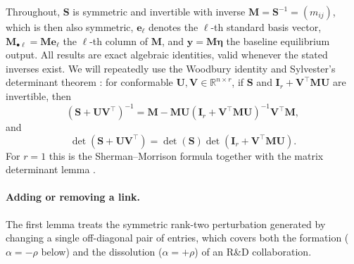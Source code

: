 Throughout, $\mathbf{S}$ is symmetric and invertible with inverse
$\mathbf{M} = \mathbf{S}^{-1} = (m_{ij})$, which is then also symmetric,
$\mathbf{e}_\ell$ denotes the $\ell$-th standard basis vector,
$\mathbf{M}_{\bullet \ell} = \mathbf{M} \mathbf{e}_\ell$ the $\ell$-th
column of $\mathbf{M}$, and $\mathbf{y} = \mathbf{M} \bm{\eta}$ the
baseline equilibrium output. All results are exact algebraic identities,
valid whenever the stated inverses exist. We will repeatedly use the
Woodbury identity and Sylvester's determinant theorem
\citep[cf.][Sec.~2.1.4]{golub2013matrix}: for conformable
$\mathbf{U}, \mathbf{V} \in \mathbb{R}^{n \times r}$, if $\mathbf{S}$
and $\mathbf{I}_r + \mathbf{V}^\top \mathbf{M} \mathbf{U}$ are
invertible, then
\begin{equation*}
(\mathbf{S} + \mathbf{U} \mathbf{V}^\top)^{-1}
=
\mathbf{M}
- \mathbf{M} \mathbf{U}
\left( \mathbf{I}_r + \mathbf{V}^\top \mathbf{M} \mathbf{U} \right)^{-1}
\mathbf{V}^\top \mathbf{M},
\end{equation*}
and
\begin{equation}
\det(\mathbf{S} + \mathbf{U} \mathbf{V}^\top)
=
\det(\mathbf{S})
\det\left( \mathbf{I}_r + \mathbf{V}^\top \mathbf{M} \mathbf{U} \right).
\label{eq:woodbury-sylvester}
\end{equation}
For $r = 1$ this is the Sherman--Morrison formula
\citep[cf.][page~124]{Meyer2000} together with the matrix determinant
lemma \citep{horn90:_matrix_analy}.

\paragraph{Adding or removing a link.}
The first lemma treats the symmetric rank-two perturbation generated by
changing a single off-diagonal pair of entries, which covers both the
formation ($\alpha = -\rho$ below) and the dissolution
($\alpha = +\rho$) of an R\&D collaboration.

